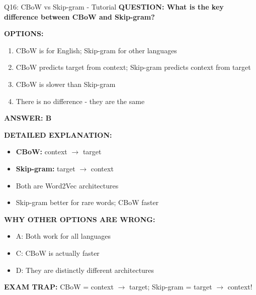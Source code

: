 \documentclass[8pt]{beamer}
\begin{document}
	\begin{frame}{Q16: CBoW vs Skip-gram - Tutorial}
		\fontsize{6.5}{7.5}\selectfont
		\textbf{QUESTION: What is the key difference between CBoW and Skip-gram?}
		
		\vspace{0.1cm}
		\textbf{OPTIONS:}
		\begin{enumerate}
			\item CBoW is for English; Skip-gram for other languages
			\item CBoW predicts target from context; Skip-gram predicts context from target
			\item CBoW is slower than Skip-gram
			\item There is no difference - they are the same
		\end{enumerate}
		
		\vspace{0.1cm}
		\textcolor{myblue}{\textbf{ANSWER: B}}
		
		\vspace{0.1cm}
		\textbf{DETAILED EXPLANATION:}
		\begin{itemize}
			\item \textbf{CBoW:} context $\to$ target
			\item \textbf{Skip-gram:} target $\to$ context
			\item Both are Word2Vec architectures
			\item Skip-gram better for rare words; CBoW faster
		\end{itemize}
		
		\vspace{0.1cm}
		\textcolor{myred}{\textbf{WHY OTHER OPTIONS ARE WRONG:}}
		\begin{itemize}
			\item \textcolor{myred}{A:} Both work for all languages
			\item \textcolor{myred}{C:} CBoW is actually faster
			\item \textcolor{myred}{D:} They are distinctly different architectures
		\end{itemize}
		
		\textcolor{myred}{\textbf{EXAM TRAP:}} CBoW = context $\to$ target; Skip-gram = \textcolor{myblue}{target $\to$ context}!
	\end{frame}
	
\end{document}
